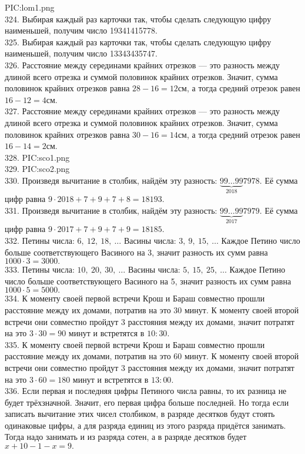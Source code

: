 {{PIC:lom1.png}}\\
324. Выбирая каждый раз карточки так, чтобы сделать следующую цифру наименьшей, получим число 19341415778.\\
325. Выбирая каждый раз карточки так, чтобы сделать следующую цифру наименьшей, получим число 13343435747.\\
326. Расстояние между серединами крайних отрезков --- это разность между длиной всего отрезка и суммой половинок крайних отрезков. Значит, сумма половинок крайних отрезков равна $28-16=12$см, а тогда средний отрезок равен $16-12=4$см.\\
327. Расстояние между серединами крайних отрезков --- это разность между длиной всего отрезка и суммой половинок крайних отрезков. Значит, сумма половинок крайних отрезков равна $30-16=14$см, а тогда средний отрезок равен $16-14=2$см.\\
328. {{PIC:sco1.png}}\\
329. {{PIC:sco2.png}}\\
330. Произведя вычитание в столбик, найдём эту разность: $\underbrace{99\ldots99}_{2018}7978.$ Её сумма цифр равна $9\cdot2018+7+9+7+8=18193.$\\
331. Произведя вычитание в столбик, найдём эту разность: $\underbrace{99\ldots99}_{2017}7979.$ Её сумма цифр равна $9\cdot2017+7+9+7+9=18185.$\\
332. Петины числа: $6,\ 12,\ 18,\ \ldots$ Васины числа: $3,\ 9,\ 15,\ \ldots$ Каждое Петино число больше соответствующего Васиного на 3, значит разность их сумм равна $1000\cdot3=3000.$\\
333. Петины числа: $10,\ 20,\ 30,\ \ldots$ Васины числа: $5,\ 15,\ 25,\ \ldots$ Каждое Петино число больше соответствующего Васиного на 5, значит разность их сумм равна $1000\cdot5=5000.$\\
334. К моменту своей первой встречи Крош и Бараш совместно прошли расстояние между их домами, потратив на это 30 минут. К моменту своей второй встречи они совместно пройдут 3 расстояния между их домами, значит потратят на это $3\cdot30=90$ минут и встретятся в $10:30.$\\
335. К моменту своей первой встречи Крош и Бараш совместно прошли расстояние между их домами, потратив на это 60 минут. К моменту своей второй встречи они совместно пройдут 3 расстояния между их домами, значит потратят на это $3\cdot60=180$ минут и встретятся в $13:00.$\\
336. Если первая и последняя цифры Петиного числа равны, то их разница не будет трёхзначной. Значит, его первая цифра больше последней. Но тогда если записать вычитание этих чисел столбиком, в разряде десятков будут стоять одинаковые цифры, а для разряда единиц из этого разряда придётся занимать. Тогда надо занимать и из разряда сотен, а в разряде десятков будет $x+10-1-x=9.$\\
